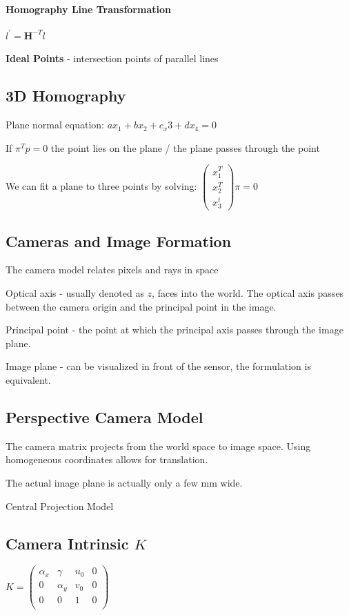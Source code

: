 
\paragraph{Homography Line Transformation}

$l^\prime = \mathbf{H}^{-T} l$

\textbf{Ideal Points} - intersection points of parallel lines

\subsection{3D Homography}

Plane normal equation: $ax_1 + bx_2 + c_x3 + d x_4 = 0$ 

If $\pi^T p = 0$ the point lies on the plane / the plane passes through the point

We can fit a plane to three points by solving:
$\left( \begin{matrix} x_1^T \\ x_2^T \\ x_3^t \end{matrix} \right) \pi = 0 $

\subsection{Cameras and Image Formation}

The camera model relates pixels and rays in space

Optical axis - usually denoted as $z$, faces into the world.
The optical axis passes between the camera origin and the principal point in the image.

Principal point - the point at which the principal axis passes through the image plane.

Image plane - can be visualized in front of the sensor, the formulation is equivalent.


\subsection{Perspective Camera Model}
The camera matrix projects from the world space to image space. Using homogeneous coordinates allows for translation.

The actual image plane is actually only a few mm wide.

Central Projection Model

\subsection{Camera Intrinsic $K$}
$K = \left( \begin{matrix} 
\alpha_x & \gamma & u_0 & 0 \\
0 & \alpha_y  & v_0 & 0 \\
0 & 0 &  1 & 0 \\
\end{matrix}
\right) $


